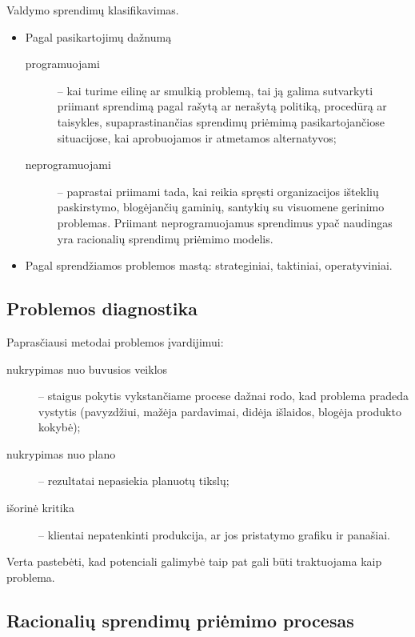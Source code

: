 Valdymo sprendimų klasifikavimas.
\begin{itemize}
  \item Pagal pasikartojimų dažnumą
    \begin{description}
      \item[programuojami] – kai turime eilinę ar smulkią problemą, tai
        ją galima sutvarkyti priimant sprendimą pagal rašytą ar
        nerašytą politiką, procedūrą ar taisykles, supaprastinančias
        sprendimų priėmimą pasikartojančiose situacijose, kai
        aprobuojamos ir atmetamos alternatyvos;
      \item[neprogramuojami] – paprastai priimami tada, kai reikia
        spręsti organizacijos išteklių paskirstymo, blogėjančių
        gaminių, santykių su visuomene gerinimo problemas. Priimant
        neprogramuojamus sprendimus ypač naudingas yra racionalių
        sprendimų priėmimo modelis.
    \end{description}
  \item Pagal sprendžiamos problemos mastą: strateginiai, taktiniai,
    operatyviniai.
\end{itemize}

\subsection{Problemos diagnostika}

Paprasčiausi metodai problemos įvardijimui:
\begin{description}
  \item[nukrypimas nuo buvusios veiklos] – staigus pokytis
    vykstančiame procese dažnai rodo, kad problema pradeda vystytis
    (pavyzdžiui, mažėja pardavimai, didėja išlaidos, blogėja produkto
    kokybė);
  \item[nukrypimas nuo plano] – rezultatai nepasiekia planuotų
    tikslų;
  \item[išorinė kritika] – klientai nepatenkinti produkcija, ar jos
    pristatymo grafiku ir panašiai.
\end{description}

Verta pastebėti, kad potenciali galimybė taip pat gali būti traktuojama
kaip problema.

\subsection{Racionalių sprendimų priėmimo procesas}

